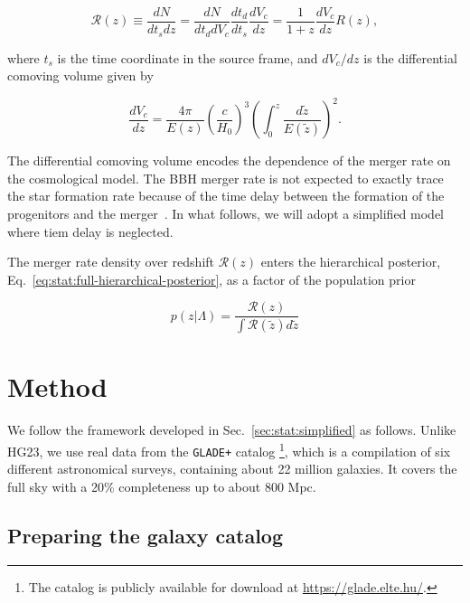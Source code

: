 \documentclass[%
preprint,
nofootinbib,
 amsmath,amssymb,
 aps,
]{revtex4-2}
\newcommand{\given}[2]{p( #1 | #2 )}
\newcommand{\pa}[1]{\left(#1\right)}
\begin{document}
\begin{equation}
	\mathcal{R}(z) \equiv \frac{dN}{dt_s dz} = \frac{dN}{dt_d dV_c} \frac{dt_d}{dt_s} \frac{dV_c}{dz} = \frac{1}{1 + z} \frac{dV_c}{dz} R(z),
\end{equation}

where $t_s$ is the time coordinate in the source frame, and $dV_c /dz$ is the differential comoving
volume given by

\begin{equation}
	\frac{dV_c}{dz} =  \frac{4 \pi }{E(z)}\pa{\frac{c}{H_0}}^3 \pa{\int_0^z \frac{d\tilde{z}}{E(\tilde{z})}}^2.
\end{equation}

The differential comoving volume encodes the dependence of the merger rate on the cosmological
model. The BBH merger rate is not expected to exactly trace the star formation rate because of the
time delay between the formation of the progenitors and the
merger~\cite{santoliquido_cosmic_2020,fishbach_time_2021,van_son_redshift_2022}. In what follows,
we will adopt a simplified model where tiem delay is neglected.

The merger rate density over redshift $\mathcal{R}(z)$ enters the hierarchical posterior,
Eq.~\eqref{eq:stat:full-hierarchical-posterior}, as a factor of the population prior

\begin{equation}
	\given{z}{\Lambda} = \frac{\mathcal{R}(z)}{\int \mathcal{R}(\tilde{z}) d\tilde{z}}
\end{equation}

\section{Method}
\label{sec:method}

We follow the framework developed in Sec.~\ref{sec:stat:simplified} as follows. Unlike HG23, we use
real data from the \texttt{GLADE+} catalog \cite{D_lya_2018,D_lya_2022} \footnote{The catalog is
	publicly available for download at \url{https://glade.elte.hu/}.}, which is a compilation of six
different astronomical surveys, containing about 22 million galaxies. It covers the full sky with a
20\% completeness up to about 800 Mpc.

\subsection{Preparing the galaxy catalog}
\end{document}
